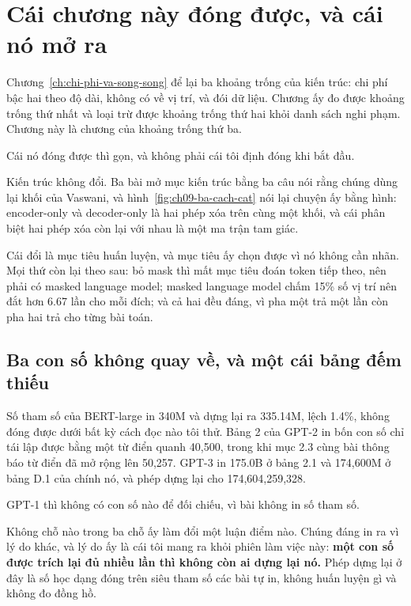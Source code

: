 \section{Cái chương này đóng được, và cái nó mở ra}
\label{sec:ch09-con-lai-gi}

%
Chương~\ref{ch:chi-phi-va-song-song} để lại ba khoảng trống của kiến trúc:
chi phí bậc hai theo độ dài, không có 
về vị trí, và đói dữ liệu. Chương ấy đo được khoảng trống thứ nhất và loại trừ được khoảng trống thứ
hai khỏi danh sách nghi phạm. Chương này là chương của khoảng trống thứ ba.

Cái nó đóng được thì gọn, và không phải cái tôi định đóng khi bắt đầu.

Kiến trúc không đổi. Ba bài mở mục kiến trúc bằng ba câu nói rằng chúng dùng
lại khối của Vaswani, và hình~\ref{fig:ch09-ba-cach-cat} nói lại chuyện ấy bằng
hình: encoder-only và decoder-only là hai phép xóa trên cùng một khối, và cái
phân biệt hai phép xóa còn lại với nhau là một ma trận tam giác.

Cái đổi là mục tiêu huấn luyện, và mục tiêu ấy chọn được vì nó không cần nhãn.
Mọi thứ còn lại theo sau: bỏ mask thì mất mục tiêu đoán token tiếp theo, nên
phải có masked language model; masked language model chấm 15\% số vị trí nên
đắt hơn 6.67 lần cho mỗi đích; và cả hai đều đáng, vì pha một trả một lần còn
pha hai trả cho từng bài toán.

\subsection*{Ba con số không quay về, và một cái bảng đếm thiếu}

%
Số tham số của BERT-large in 340M và dựng lại ra 335.14M, lệch 1.4\%, không
đóng được dưới bất kỳ cách đọc nào tôi thử. Bảng 2 của GPT-2 in bốn con số chỉ
tái lập được bằng một từ điển quanh 40,500, trong khi mục 2.3 cùng bài thông báo
từ điển đã mở rộng lên 50,257. GPT-3 in 175.0B ở bảng 2.1 và 174,600M ở bảng
D.1 của chính nó, và phép dựng lại cho 174,604,259,328.

GPT-1 thì không có con số nào để đối chiếu, vì bài không in số tham số.

Không chỗ nào trong ba chỗ ấy làm đổi một luận điểm nào. Chúng đáng in ra vì lý
do khác, và lý do ấy là cái tôi mang ra khỏi phiên làm việc này: \textbf{một con
số được trích lại đủ nhiều lần thì không còn ai dựng lại nó.} Phép dựng lại ở
đây là số học dạng đóng trên siêu tham số các bài tự in, không huấn luyện gì và
không đo đồng hồ.

